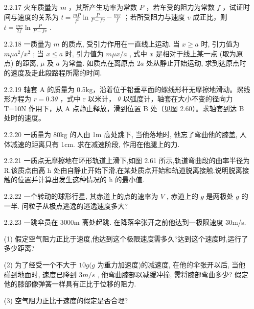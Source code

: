 \begin{problem}{2.2.17}
火车质量为 $m$ ，其所产生功率为常数 $P$ ，若车受的阻力为常数 $f$ ，试证时间与速度的关系为 $t = \frac{mP}{f^2} \ln \frac{P}{P - fv} - \frac{mv}{f}$ ；若所受阻力与速度 $v$ 成正比，则 $t = \frac{mv}{2f} \ln \frac{P}{P - fv}$ .
\end{problem}
\clearpage


\begin{problem}{2.2.18}
一质量为 $m$ 的质点, 受引力作用在一直线上运动. 当 $x \geqslant a$ 时, 引力值为 $m\mu a^2 / x^2$ ; 当 $x \leqslant a$ 时, 引力值为 $m\mu x / a$ , 式中 $x$ 是相对于线上某一点 (取为原点) 的距离, $\mu$ 及 $a$ 为常量. 如质点在离原点 $2a$ 处从静止开始运动, 求到达原点时的速度及走此段路程所需的时间.
\end{problem}
\clearpage


\begin{problem}{2.2.19}
轴套 A 的质量为 0.5kg，沿着位于铅垂平面的螺线形杆无摩擦地滑动。螺线形方程为 $r=0.3\theta$ ，式中 r 以米计， $\theta$ 以弧度计，轴套在大小不变的径向力 T=10N 作用下，从 A 点静止释放，滑到位置 B 处（见图 2.60）。求轴套到达 B 处时的速度。
\begin{center}

\end{center}
\end{problem}
\clearpage


\begin{problem}{2.2.20}
一质量为 80kg 的人由 1m 高处跳下, 当他落地时, 他忘了弯曲他的膝盖, 人体减速的距离只有 1cm. 求在减速阶段, 作用在他腿上的力.
\end{problem}
\clearpage


\begin{problem}{2.2.21}
一质点无摩擦地在环形轨道上滑下,如图 2.61 所示,轨道弯曲段的曲率半径为 R,该质点由高 h 处由自静止开始下滑,在某处质点开始和轨道脱离接触,说明脱离接触的位置并计算出发生这种情况的 h 的最小值.
\begin{center}

\end{center}
\end{problem}
\clearpage


\begin{problem}{2.2.22}
一个转动的球形行星, 其赤道上的点的速率为 $V$ , 赤道上的 $g$ 是两极处 $g$ 的一半. 问粒子从极点逃逸的逃逸速度多大?
\end{problem}
\clearpage


\begin{problem}{2.2.23}
一跳伞员在 3000m 高处起跳. 在降落伞张开之前他达到一极限速度 30m/s.

(1) 假定空气阻力正比于速度,他达到这个极限速度需多久?达到这个速度时,运行了多少距离?

(2) 为了经受一个不大于 $10g(g$ 为重力加速度)的减速度, 在他的伞张开以后, 当他碰到地面时, 速度已降到 $3m/s$ , 他弯曲膝部以减缓冲撞, 需将膝部弯曲多少? 假定他的膝部像弹簧一样具有正比于位移的阻力.

(3) 空气阻力正比于速度的假定是否合理?
\end{problem}
\clearpage


